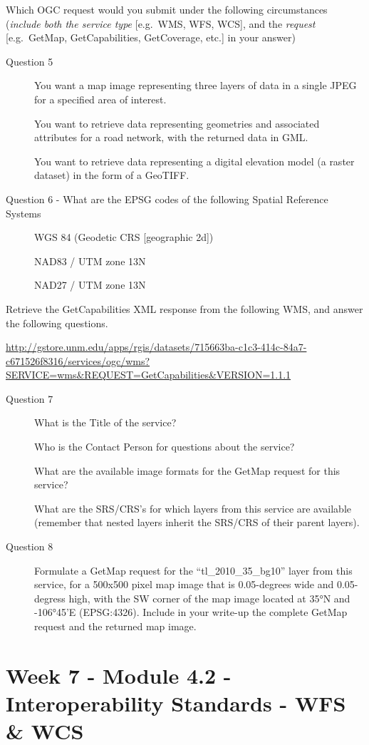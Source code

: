 \documentclass[]{book}
\begin{document}
Which OGC request would you submit under the following circumstances
(\emph{include both the service type} {[}e.g.~WMS, WFS, WCS{]}, and the
\emph{request} {[}e.g.~GetMap, GetCapabilities, GetCoverage, etc.{]} in
your answer)

\begin{description}
\item[Question 5]
You want a map image representing three layers of data in a single JPEG
for a specified area of interest.

You want to retrieve data representing geometries and associated
attributes for a road network, with the returned data in GML.

You want to retrieve data representing a digital elevation model (a
raster dataset) in the form of a GeoTIFF.
\item[Question 6 - What are the EPSG codes of the following Spatial
Reference Systems]
WGS 84 (Geodetic CRS {[}geographic 2d{]})

NAD83 / UTM zone 13N

NAD27 / UTM zone 13N
\end{description}

Retrieve the GetCapabilities XML response from the following WMS, and
answer the following questions.

\url{http://gstore.unm.edu/apps/rgis/datasets/715663ba-c1c3-414c-84a7-c671526f8316/services/ogc/wms?SERVICE=wms\&REQUEST=GetCapabilities\&VERSION=1.1.1}

\begin{description}
\item[Question 7]
What is the Title of the service?

Who is the Contact Person for questions about the service?

What are the available image formats for the GetMap request for this
service?

What are the SRS/CRS's for which layers from this service are available
(remember that nested layers inherit the SRS/CRS of their parent
layers).
\item[Question 8]
Formulate a GetMap request for the ``tl\_2010\_35\_bg10'' layer from
this service, for a 500x500 pixel map image that is 0.05-degrees wide
and 0.05-degress high, with the SW corner of the map image located at
35°N and -106°45'E (EPSG:4326). Include in your write-up the complete
GetMap request and the returned map image.
\end{description}

\chapter{Week 7 - Module 4.2 - Interoperability Standards - WFS \&
WCS}\label{week07}
\end{document}
